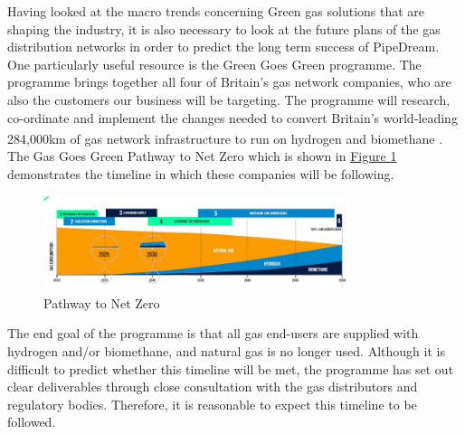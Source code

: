 \documentclass[11pt]{article}		%
\newcommand{\supercite}[1]{\textsuperscript{\cite{#1}}}		%
\newcommand{\figref}[1]{\hyperref[#1]{Figure \ref*{#1}}}    %
\begin{document}
    		Having looked at the macro trends concerning Green gas solutions that are shaping the industry, it is also necessary to look at the future plans of the gas distribution networks in order to predict the long term success of PipeDream. \\
        	\hspace*{3ex}One particularly useful resource is the Green Goes Green programme. The programme brings together all four of Britain’s gas network companies, who are also the customers our business will be targeting. The programme will research, co-ordinate and implement the changes needed to convert Britain’s world-leading 284,000km of gas network infrastructure to run on hydrogen and biomethane \supercite{gasgoesgreen}. The Gas Goes Green Pathway to Net Zero which is shown in \figref{forecast} demonstrates the timeline in which these companies will be following.
    
    		\begin{figure}[h]
    			\centering
    			\includegraphics[width = 0.8\textwidth]{futureforecaset.jpg}
    			\caption{Pathway to Net Zero \supercite{gasgoesgreen} }	
    			\label{forecast}
    		\end{figure}
    		
    		The end goal of the programme is that all gas end-users are supplied with hydrogen and/or biomethane, and natural gas is no longer used. Although it is difficult to predict whether this timeline will be met, the programme has set out clear deliverables through close consultation with the gas distributors and regulatory bodies. Therefore, it is reasonable to expect this timeline to be followed. 
    
    		
\end{document}
